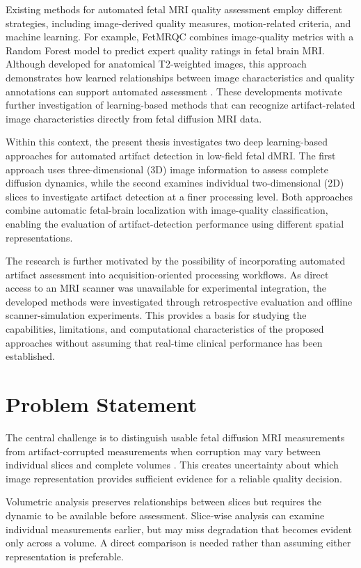 Existing methods for automated fetal MRI quality assessment employ different strategies, including image-derived quality measures, motion-related criteria, and machine learning. For example, FetMRQC combines image-quality metrics with a Random Forest model to predict expert quality ratings in fetal brain MRI. Although developed for anatomical T2-weighted images, this approach demonstrates how learned relationships between image characteristics and quality annotations can support automated assessment \autocite{sanchez2024fetmrqc}. These developments motivate further investigation of learning-based methods that can recognize artifact-related image characteristics directly from fetal diffusion MRI data.

Within this context, the present thesis investigates two deep learning-based approaches for automated artifact detection in low-field fetal dMRI. The first approach uses three-dimensional (3D) image information to assess complete diffusion dynamics, while the second examines individual two-dimensional (2D) slices to investigate artifact detection at a finer processing level. Both approaches combine automatic fetal-brain localization with image-quality classification, enabling the evaluation of artifact-detection performance using different spatial representations.

The research is further motivated by the possibility of incorporating automated artifact assessment into acquisition-oriented processing workflows. As direct access to an MRI scanner was unavailable for experimental integration, the developed methods were investigated through retrospective evaluation and offline scanner-simulation experiments. This provides a basis for studying the capabilities, limitations, and computational characteristics of the proposed approaches without assuming that real-time clinical performance has been established.

\section{Problem Statement}

The central challenge is to distinguish usable fetal diffusion MRI measurements from artifact-corrupted measurements when corruption may vary between individual slices and complete volumes \autocite{malamateniou2013motion,snoussi2025haitch}. This creates uncertainty about which image representation provides sufficient evidence for a reliable quality decision.

Volumetric analysis preserves relationships between slices but requires the dynamic to be available before assessment. Slice-wise analysis can examine individual measurements earlier, but may miss degradation that becomes evident only across a volume. A direct comparison is needed rather than assuming either representation is preferable.

